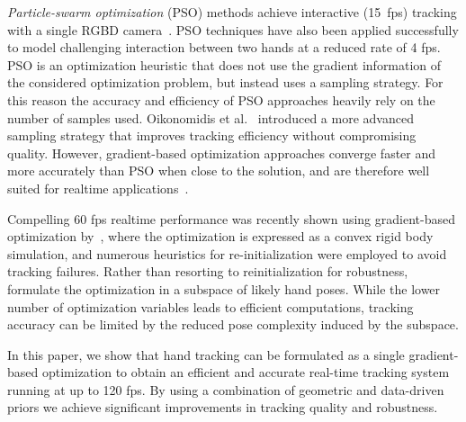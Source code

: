 \emph{Particle-swarm optimization} (PSO) methods achieve interactive (15~fps) tracking with a single RGBD camera~\cite{oiko2011hand}. PSO techniques have also been applied successfully to model challenging interaction between two hands \cite{oiko_cvpr12} at a reduced rate of 4 fps. 
PSO is an optimization heuristic that does not use the gradient information of the considered optimization problem, but instead uses a sampling strategy.
For this reason the accuracy and efficiency of PSO approaches heavily rely on the number of samples used. Oikonomidis et al.~\cite{oikonomidis2014evolutionary} introduced a more advanced sampling strategy that improves tracking efficiency without compromising quality. However, gradient-based optimization approaches  converge faster and more accurately than PSO when close to the solution, and are therefore well suited for realtime applications~\cite{qian2014realtime}.


Compelling 60 fps realtime performance was recently shown using gradient-based optimization by~\cite{melax2013dynamics}, where the optimization is expressed as a convex rigid body simulation, and numerous heuristics for re-initialization were employed to avoid tracking failures. Rather than resorting to reinitialization for robustness, \cite{schroder2014real} formulate the optimization in a subspace of likely hand poses. While the lower number of optimization variables leads to efficient computations, tracking accuracy can be limited by the reduced pose complexity induced by the subspace.

 In this paper, we show that hand tracking can be formulated as a single gradient-based optimization to obtain an efficient and accurate real-time tracking system running at up to 120 fps. By using a combination of geometric and data-driven priors we achieve significant improvements in tracking quality and robustness.
